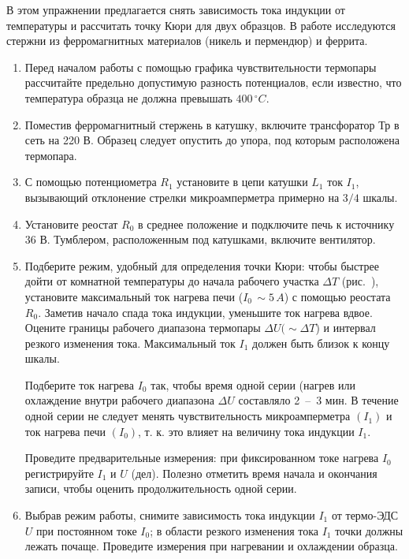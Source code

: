 \begin{lab:task}

В этом упражнении предлагается снять зависимость тока индукции от температуры и рассчитать точку Кюри для двух образцов. В работе исследуются стержни из ферромагнитных материалов (никель и пермендюр) и феррита.

\begin{enumerate}
\item 
  \label{item:1}
  Перед началом работы с помощью графика чувствительности термопары рассчитайте предельно допустимую разность потенциалов, если известно, что температура образца не должна превышать $400\,^{\circ}C$.
\item
  Поместив ферромагнитный стержень в катушку, включите трансфоратор $\text{Тр}$ в сеть на 220 В. Образец следует опустить до упора, под которым расположена термопара.
\item
  С помощью потенциометра $R_1$ установите в цепи катушки $L_1$ ток $I_1$, вызывающий отклонение стрелки микроамперметра примерно на $3/4$ шкалы.
\item
  Установите реостат $R_0$ в среднее положение и подключите печь к ис­точнику 36 В. Тумблером, расположенным под катушками, включите вентилятор.
\item
  Подберите режим, удобный для определения точки Кюри: чтобы быстрее дойти от комнатной температуры до начала рабочего участка $\Delta T$ (рис.~), установите максимальный ток нагрева печи ($I_0\,\sim5\,A$) с помощью реостата $R_0$. Заметив начало спада тока индукции, уменьшите ток нагрева вдвое. Оцените границы рабочего диапазона термопары $\Delta U ( \sim\Delta T$) и интервал резкого изменения тока. Максимальный ток $I_1$ должен быть близок к концу шкалы.


Подберите ток нагрева $I_0$ так, чтобы время одной серии (нагрев или охлаждение внутри рабочего диапазона $\Delta U$ составляло 2~--~3 мин. В течение одной серии не следует менять чувствительность микроамперметра $(I_1)$ и ток нагрева печи $(I_0)$, т. к. это влияет на величину тока индукции $I_1$.

Проведите предварительные измерения: при фиксированном токе нагрева $I_0$ регистрируйте $I_1$ и $U$ (дел). Полезно отметить время начала и окончания записи, чтобы оценить продолжительность одной серии.


\item
  Выбрав режим работы, снимите зависимость тока индукции $I_1$ от термо-ЭДС $U$ при постоянном токе $I_0$; в
  области резкого изменения тока $I_1$ точки должны лежать почаще. Проведите измерения при нагревании и охлаждении образца.


\end{enumerate}
\end{lab:task}
